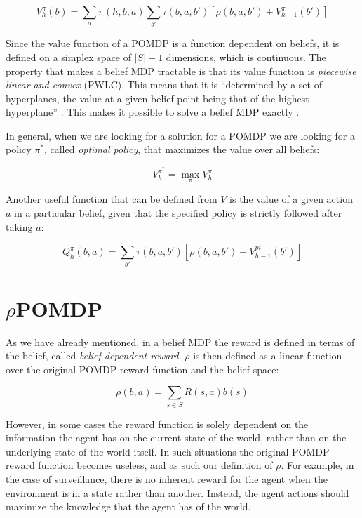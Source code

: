\[ V^{\pi}_{h}(b) = \sum_a \pi(h, b, a) \sum_{b'} \tau(b, a, b') \left [ \rho(b, a, b') +
V^{\pi}_{h-1}(b') \right ] \]

Since the value function of a POMDP is a function dependent on beliefs, it is defined on a simplex
space of $|S|-1$ dimensions, which is continuous. The property that makes a belief MDP tractable is
that its value function is \textit{piecewise linear and convex} (PWLC). This means that it is
``determined by a set of hyperplanes, the value at a given belief point being that of the highest
hyperplane'' \cite{cit:rpomdp}. This makes it possible to solve a belief MDP exactly
\cite{cit:pomdp}.


In general, when we are looking for a solution for a POMDP we are looking for a policy $\pi^*$, called
\textit{optimal policy}, that maximizes the value over all beliefs:

\[ V^{\pi^*}_h = \max_\pi V^{\pi}_h \]

Another useful function that can be defined from $V$ is the value of a given action $a$ in a
particular belief, given that the specified policy is strictly followed after taking $a$:

\[ Q^{\pi}_h(b, a) = \sum_{b'} \tau(b,a,b') \left[ \rho(b,a,b') + V^{pi}_{h-1}(b') \right ] \]


\section{$\rho$POMDP}

As we have already mentioned, in a belief MDP the reward is defined in terms of the belief, called
\textit{belief dependent reward}. $\rho$ is then defined as a linear function over the original
POMDP reward function and the belief space:

\[ \rho(b,a) = \sum_{s\in S} R(s,a) b(s) \]

However, in some cases the reward function is solely dependent on the information the agent has on
the current state of the world, rather than on the underlying state of the world itself. In such
situations the original POMDP reward function becomes useless, and as such our definition of $\rho$.
For example, in the case of surveillance, there is no inherent reward for the agent when the
environment is in a state rather than another. Instead, the agent actions should maximize the
knowledge that the agent has of the world.

